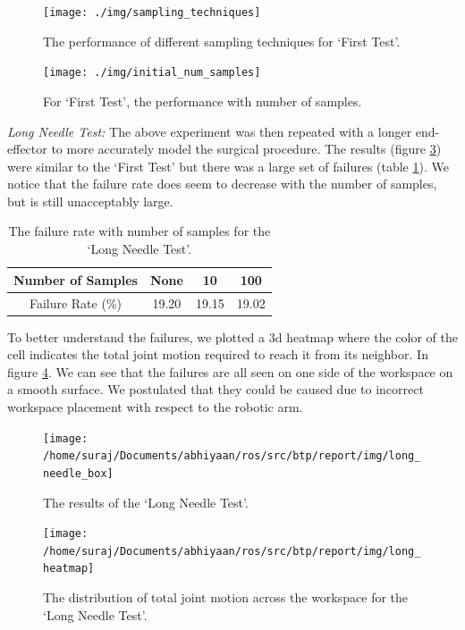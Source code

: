 \documentclass[BTech]{iitmdiss}
\begin{document}
    \begin{figure}
        \centering
        \texttt{[image: ./img/sampling\_techniques]}
        \caption{The performance of different sampling techniques for `First Test'.}
        \label{fig:sampling_techniques}
    \end{figure}

    \begin{figure}
        \centering
        \texttt{[image: ./img/initial\_num\_samples]}
        \caption{For `First Test', the performance with number of samples.}
        \label{fig:initial_num_samples}
    \end{figure}

    \emph{Long Needle Test:} The above experiment was then repeated with a longer end-effector to more accurately model the surgical procedure.
    The results (figure \ref{fig:long_needle_box}) were similar to the `First Test' but there was a large set of failures  (table \ref{tab:failure_rate}).
    We notice that the failure rate does seem to decrease with the number of samples, but is still unacceptably large.
    \begin{table}[h]
        \centering
        \begin{tabular}{|c|c|c|c|}
            \hline
            Number of Samples & None  & 10    & 100   \\ \hline
            Failure Rate (\%) & 19.20 & 19.15 & 19.02 \\ \hline
        \end{tabular}
        \caption{The failure rate with number of samples for the `Long Needle Test'.}
        \label{tab:failure_rate}
    \end{table}
    To better understand the failures, we plotted a 3d heatmap where the color of the cell indicates the total joint motion required to reach it from its neighbor.
    In figure \ref{fig:long_heatmap}. We can see that the failures are all seen on one side of the workspace on a smooth surface.
    We postulated that they could be caused due to incorrect workspace placement with respect to the robotic arm.

    \begin{figure}
        \centering
        \texttt{[image: /home/suraj/Documents/abhiyaan/ros/src/btp/report/img/long\_needle\_box]}
        \caption{The results of the `Long Needle Test'.}
        \label{fig:long_needle_box}
    \end{figure}

    \begin{figure}
        \centering
        \texttt{[image: /home/suraj/Documents/abhiyaan/ros/src/btp/report/img/long\_heatmap]}
        \caption{The distribution of total joint motion across the workspace for the `Long Needle Test'.}
        \label{fig:long_heatmap}
    \end{figure}
\end{document}
